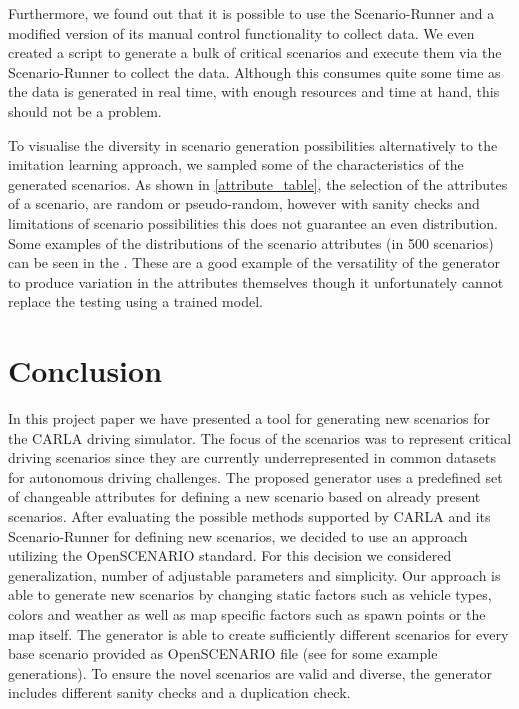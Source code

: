 \documentclass[conference, a4paper, 11pt]{IEEEtran}
\begin{document}
	Furthermore, we found out that it is possible to use the Scenario-Runner and a modified version of its manual control functionality to collect data. We even created a script to generate a bulk of critical scenarios and execute them via the Scenario-Runner to collect the data.
	Although this consumes quite some time as the data is generated in real time, with enough resources and time at hand, this should not be a problem.
	
	To visualise the diversity in scenario generation possibilities alternatively to the imitation learning approach, we sampled some of the characteristics of the generated scenarios. As shown in \autoref{attribute_table}, the selection of the attributes of a scenario, are random or pseudo-random, however with sanity checks and limitations of scenario possibilities this does not guarantee an even distribution. Some examples of the distributions of the scenario attributes (in 500 scenarios) can be seen in the . These are a good example of the versatility of the generator to produce variation in the attributes themselves though it unfortunately cannot replace the testing using a trained model.
	
	\section{Conclusion}
	In this project paper we have presented a tool for generating new scenarios for the CARLA driving simulator. The focus of the scenarios was to represent critical driving scenarios since they are currently underrepresented in common datasets for autonomous driving challenges.
	The proposed generator uses a predefined set of changeable attributes for defining a new scenario based on already present scenarios. After evaluating the possible methods supported by CARLA and its Scenario-Runner for defining new scenarios, we decided to use an approach utilizing the OpenSCENARIO standard. For this decision we considered generalization, number of adjustable parameters and simplicity. Our approach is able to generate new scenarios by changing static factors such as vehicle types, colors and weather as well as map specific factors such as spawn points or the map itself. The generator is able to create sufficiently different scenarios for every base scenario provided as OpenSCENARIO file (see  for some example generations). To ensure the novel scenarios are valid and diverse, the generator includes different sanity checks and a duplication check.
	
\end{document}
